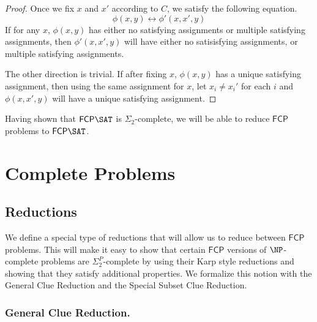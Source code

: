 \documentclass[runningheads,a4paper]{llncs}
\begin{document}
\begin{proof}
Once we fix $x$ and $x'$ according to $C$, we satisfy the following equation. 
\begin{equation}
\label{eq:phiandphisame}
 \phi(x, y) \leftrightarrow \phi'(x,x',y) 
\end{equation}
If for any $x$, $\phi(x,y)$ has either no satisfying assignments or multiple satisfying assignments, then $\phi'(x,x',y)$ will have either no satisisfying assignments, or multiple satisfying assignments. 

The other direction is trivial. If after fixing $x$, $\phi(x,y)$ has a unique satisfying assignment, then using the same assignment for $x$, let $x_i \neq x_i'$ for each $i$ and $\phi(x,x',y)$ will have a unique satisfying assignment.

\end{proof}

Having shown that $\mathsf{FCP} \SAT$ is $\Sigma_2$-complete, we will be able to reduce $\mathsf{FCP}$ problems to $\mathsf{FCP} \SAT$.

\section{Complete Problems}
\label{sec:The Problems}

\subsection{Reductions}

We define a special type of reductions that will allow us to reduce between $\mathsf{FCP}$ problems. This will make it easy to show that certain $\mathsf{FCP}$ versions of $\NP$-complete problems are $\Sigma_2^P$-complete by using their Karp style reductions and showing that they satisfy additional properties. We formalize this notion with the General Clue Reduction and the Special Subset Clue Reduction. 

\subsubsection{General Clue Reduction.}
\end{document}
